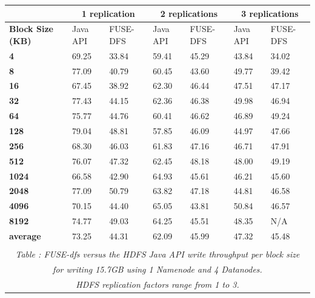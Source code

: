\documentclass[11]{article}
\begin{document}
\begin{center}
\begin{tabular}[tbp]{| l || l | l || l | l || l | l |}

\hline
& \multicolumn{2}{|c||}{1 replication} & \multicolumn{2}{|c||}{2 replications} & \multicolumn{2}{|c|}{3 replications} \\
\hline
\hline
\textbf{Block Size (KB)}	& Java API & FUSE-DFS & Java API & FUSE-DFS & Java API & FUSE-DFS\\
\hline
\textbf{4}	&	69.25	&	33.84	&	59.41	&	45.29	&	43.84	&	34.02	\\
\textbf{8}	&	77.09	&	40.79	&	60.45	&	43.60	&	49.77	&	39.42	\\
\textbf{16}	&	67.45	&	38.92	&	62.30	&	46.44	&	47.51	&	47.17	\\
\textbf{32}	&	77.43	&	44.15	&	62.36	&	46.38	&	49.98	&	46.94	\\
\textbf{64}	&	75.77	&	44.76	&	60.41	&	46.62	&	46.89	&	49.24	\\
\textbf{128}	&	79.04	&	48.81	&	57.85	&	46.09	&	44.97	&	47.66	\\
\textbf{256}	&	68.30	&	46.03	&	61.83	&	47.16	&	46.71	&	47.91	\\
\textbf{512}	&	76.07	&	47.32	&	62.45	&	48.18	&	48.00	&	49.19	\\
\textbf{1024}	&	66.58	&	42.90	&	64.93	&	45.61	&	46.21	&	45.60	\\
\textbf{2048}	&	77.09	&	50.79	&	63.82	&	47.18	&	44.81	&	46.58	\\
\textbf{4096}	&	70.15	&	44.40	&	65.05	&	43.81	&	50.84	&	46.57	\\
\textbf{8192}	&	74.77	&	49.03	&	64.25	&	45.51	&	48.35	&	N/A		\\
\hline
\hline
\textbf{average} &	73.25	&	44.31	&	62.09	&	45.99	&	47.32	&	45.48\\
\hline
\multicolumn{7}{c}{\hfill}\\
\multicolumn{7}{c}{\emph{Table : FUSE-dfs versus the HDFS Java API \textit{write} throughput per block size }}\\
\multicolumn{7}{c}{\emph{for writing 15.7GB using \textit{1 Namenode} and \textit{4 Datanodes}.}}\\
\multicolumn{7}{c}{\emph{HDFS replication factors range from 1 to 3.}}\\
\end{tabular}
\end{center}
\end{document}
